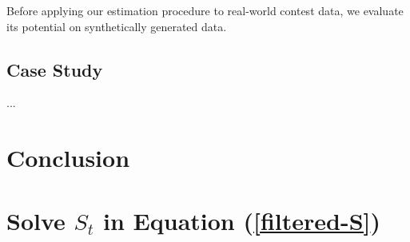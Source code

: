 \documentclass[a4paper, 11pt]{article}
\theoremstyle{plain} %
\begin{document}
Before applying our estimation procedure to real-world contest data, we evaluate its potential on synthetically generated data.



\subsection{Case Study}

...


\newpage
\section{Conclusion}

\newpage


\newpage
\appendix
\small






\section{Solve $S_t$ in Equation (\ref{filtered-S})}\label{app-S-equ}
\end{document}
